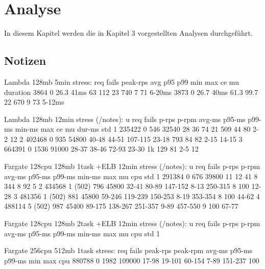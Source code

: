 \chapter{Analyse}
In diesem Kapitel werden die in Kapitel 3 vorgestellten Analysen durchgeführt.

\section{Notizen}

Lambda 128mb 5min stress:
req     fails   peak-rps    avg     p95     p99     min     max     ce  mu  duration 
3864    0       26.3        41ms    63      112     23      740     7   71  6-20ms
3873    0       26.7        40ms    61.3    99.7    22      670     9   73  5-12ms

Lambda 128mb 12min stress (/notes):
u   req     fails   p-rps   p-rpm   avg-ms  p95-ms  p99-ms  min-ms  max ce  mu  dur-ms  std
1   235422  0       546     32540   28      36      74      21      509 44  80  2-2     12
2   402468  0       935     54800   40-48   44-51   107-115 23-18   793 84  82  2-15    14-15
3   664391  0       1536    91000   28-37   38-46   72-93   23-30   1k  129 81  2-5     12

Fargate 128cpu 128mb 1task +ELB 12min stress (/notes):
u   req     fails   p-rps   p-rpm   avg-ms  p95-ms  p99-ms  min-ms  max     mu  cpu     std
1   291384  0       676     39800   11      12      41      8       344     8   92      5
2   434568  1 (502) 796     45800   32-41   80-89   147-152 8-13    250-315 8   100     12-28
3   481356  1 (502) 881     45800   59-246  119-239 150-253 8-19    353-354 8   100     44-62
4   488114  5 (502) 987     45400   89-175  138-267 251-357 9-89    457-550 9   100     67-77

Fargate 128cpu 128mb 2task +ELB 12min stress (/notes):
u   req     fails   p-rps   p-rpm   avg-ms  p95-ms  p99-ms  min-ms  max     mu  cpu     std
1      

Fargate 256cpu 512mb 1task stress:
req     fails   peak-rps    peak-rpm    avg-ms  p95-ms  p99-ms  min     max     cpu
880788  0       1982        109000      17-98   19-101  60-154  7-89    151-237 100
